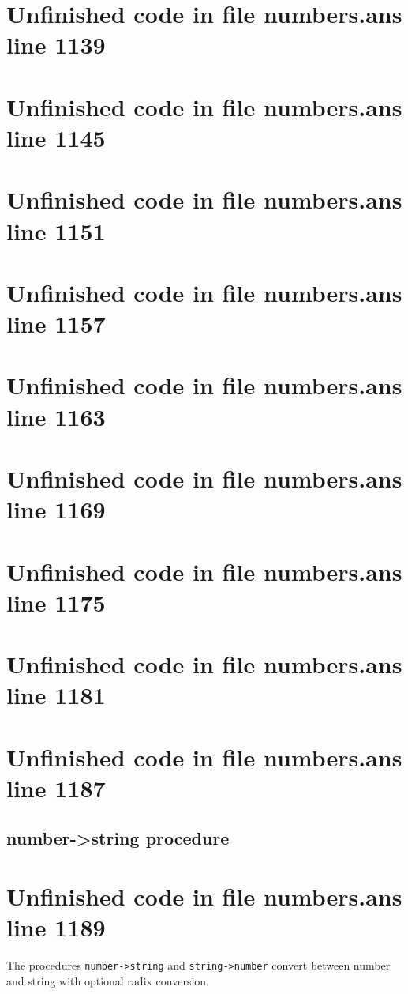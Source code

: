 \documentclass[twoside,9pt]{report}
\begin{document}
\section{Unfinished code in file numbers.ans line 1139}
\section{Unfinished code in file numbers.ans line 1145}
\section{Unfinished code in file numbers.ans line 1151}
\section{Unfinished code in file numbers.ans line 1157}
\section{Unfinished code in file numbers.ans line 1163}
\section{Unfinished code in file numbers.ans line 1169}
\section{Unfinished code in file numbers.ans line 1175}
\section{Unfinished code in file numbers.ans line 1181}
\section{Unfinished code in file numbers.ans line 1187}
\subsection{number->string procedure}
\label{number->string-procedure}
\section{Unfinished code in file numbers.ans line 1189}


The procedures \texttt{number->string} and \texttt{string->number} convert between number and string with optional radix conversion.
\end{document}
